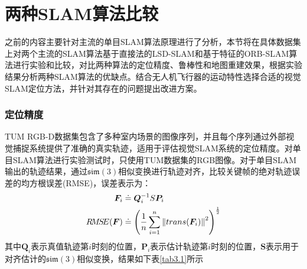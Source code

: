 \section{两种SLAM算法比较}
之前的内容主要针对主流的单目SLAM算法原理进行了分析，本节将在具体数据集上对两个主流的SLAM算法基于直接法的LSD-SLAM和基于特征的ORB-SLAM算法进行实验和比较，对比两种算法的定位精度、鲁棒性和地图重建效果，根据实验结果分析两种SLAM算法的优缺点。结合无人机飞行器的运动特性选择合适的视觉SLAM定位方法，并针对其存在的问题提出改进方案。

\subsubsection*{定位精度}
TUM RGB-D数据集\upcite{[3.12]}包含了多种室内场景的图像序列，并且每个序列通过外部视觉捕捉系统提供了准确的真实轨迹，适用于评估视觉SLAM系统的定位精度。对单目SLAM算法进行实验测试时，只使用TUM数据集的RGB图像。对于单目SLAM输出的轨迹结果，通过$\mathfrak{sim}(3)$相似变换进行轨迹对齐，比较关键帧的绝对轨迹误差的均方根误差(RMSE)，误差表示为：
\begin{equation}
\label{equ3.23}
\begin{aligned}
\boldsymbol{F}_i &\doteq \boldsymbol{Q}_i^{-1} S \boldsymbol{P}_i
\\ 
R\!M\!S\!E(\boldsymbol{F}) &\doteq \left( {1 \over n} \sum\limits_{i=1}^n \left \Vert trans(\boldsymbol{F}_i) \right \Vert^2 \right)^{1 \over 2} 
\end{aligned}
\end{equation}
其中$\boldsymbol{Q}_i$表示真值轨迹第$i$时刻的位置，$\boldsymbol{P}_i$表示估计轨迹第$i$时刻的位置，$\boldsymbol{S}$表示用于对齐估计的$\mathfrak{sim}(3)$相似变换，结果如下表\ref{tab3.1}所示

